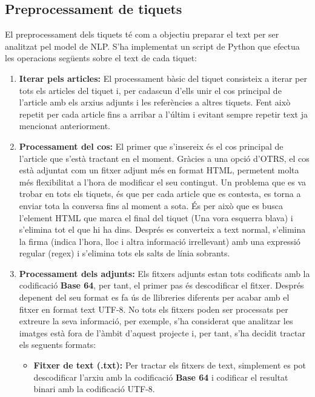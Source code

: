 \subsection{Preprocessament de tiquets}
El preprocessament dels tiquets té com a objectiu preparar el text per ser analitzat pel model de NLP. S'ha implementat un script de Python que efectua les operacions següents sobre el text de cada tiquet:
\begin{enumerate}
     \item \textbf{Iterar pels articles:} El processament bàsic del tiquet consisteix a iterar per tots els articles del tiquet i, per cadascun d'ells unir el cos principal de l'article amb els arxius adjunts i les referències a altres tiquets. Fent això repetit per cada article fins a arribar a l'últim i evitant sempre repetir text ja mencionat anteriorment.
     \item \textbf{Processament del cos:} El primer que s'insereix és el cos principal de l'article que s'està tractant en el moment. Gràcies a una opció d'OTRS, el cos està adjuntat com un fitxer adjunt més en format HTML, permetent molta més flexibilitat a l'hora de modificar el seu contingut. Un problema que es va trobar en tots els tiquets, és que per cada article que es contesta, es torna a enviar tota la conversa fins al moment a sota. És per això que es busca l'element HTML que marca el final del tiquet (Una vora esquerra blava) i s'elimina tot el que hi ha dins. Després es converteix a text normal, s'elimina la firma (indica l'hora, lloc i altra informació irrellevant) amb una expressió regular (regex) i s'elimina tots els salts de línia sobrants.
     \item \textbf{Processament dels adjunts:} Els fitxers adjunts estan tots codificats amb la codificació \textbf{Base 64}, per tant, el primer pas és descodificar el fitxer. Després depenent del seu format es fa ús de llibreries diferents per acabar amb el fitxer en format text UTF-8. No tots els fitxers poden ser processats per extreure la seva informació, per exemple, s'ha considerat que analitzar les imatges està fora de l'àmbit d'aquest projecte i, per tant, s'ha decidit tractar els seguents formats:
          \begin{itemize}
               \item \textbf{Fitxer de text (.txt):} Per tractar els fitxers de text, simplement es pot descodificar l'arxiu amb la codificació \textbf{Base 64} i codificar el resultat binari amb la codificació UTF-8.

\end{itemize}
\end{enumerate}
